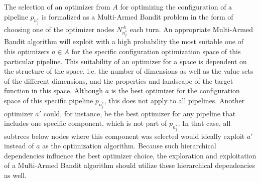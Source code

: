 The selection of an optimizer from $A$ for optimizing the configuration of a pipeline $p_{n^*_j}$ is formalized as a Multi-Armed Bandit problem in the form of choosing one of the optimizer nodes $N^A_{n^*_j}$ each turn.
An appropriate Multi-Armed Bandit algorithm will exploit with a high probability the most suitable one of this optimizers $a \in A$ for the specific configuration optimization space of this particular pipeline.
This suitability of an optimizer for a space is dependent on the structure of the space, i.e. the number of dimensions as well as the value sets of the different dimensions, and the properties and landscape of the target function in this space.\newline
Although $a$ is the best optimizer for the configuration space of this specific pipeline $p_{n^*_j}$, this does not apply to all pipelines.
Another optimizer $a'$ could, for instance, be the best optimizer for any pipeline that includes one specific component, which is not part of $p_{n^*_j}$.
In that case, all subtrees below nodes where this component was selected would ideally exploit $a'$ instead of $a$ as the optimization algorithm.
Because such hierarchical dependencies influence the best optimizer choice, the exploration and exploitation of a Multi-Armed Bandit algorithm should utilize these hierarchical dependencies as well.

